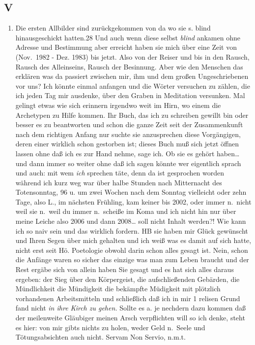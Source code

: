 \documentclass[
]{article}
\author{}
\date{\vspace{-2.5em}}
\providecommand{\tightlist}{%
  \setlength{\itemsep}{0pt}\setlength{\parskip}{0pt}}
\begin{document}
\subsection{V}\label{v}

\begin{enumerate}
\def\labelenumi{\alph{enumi}.}
\setcounter{enumi}{3}
\tightlist
\item
  Die ersten Allbilder sind zurückgekommen von da wo sie s. blind
  hinausgeschickt hatten.28 Und auch wenn diese selbst \emph{blind}
  ankamen ohne Adresse und Bestimmung aber erreicht haben sie mich über
  eine Zeit von (Nov.~1982 - Dez. 1983) bis jetzt. Also von der Reiser
  und bis in den Rausch, Rausch des Alleinseins, Rausch der Besinnung.
  Aber wie den Menschen das erklären was da passiert zwischen mir, ihm
  und dem großen Ungeschriebenen vor uns? Ich könnte einmal anfangen und
  die Wörter versuchen zu zählen, die ich jeden Tag mir ausdenke, über
  den Graben in Meditation versunken. Mal gelingt etwas wie sich
  erinnern irgendwo weit im Hirn, wo einem die Archetypen zu Hilfe
  kommen. Ihr Buch, das ich zu schreiben gewillt bin oder besser es zu
  beantworten und schon die ganze Zeit seit der Zusammenkunft nach dem
  richtigen Anfang nur suchte sie anzusprechen diese Vorgängigen, deren
  einer wirklich schon gestorben ist; dieses Buch muß sich jetzt öffnen
  lassen ohne daß ich es zur Hand nehme, sage ich. Ob sie es gehört
  haben\ldots{} und dann immer so weiter ohne daß ich sagen könnte wer
  eigentlich sprach und auch: mit wem \emph{ich} sprechen täte, denn da
  ist gesprochen worden während ich kurz weg war über halbe Stunden nach
  Mitternacht des Totensonntag, 96 u. um zwei Wochen nach dem Sonntag
  vielleicht oder zehn Tage, also L., im nächsten Frühling, kam keiner
  bis 2002, oder immer n.~nicht weil sie n.~weil du immer n.~scheiße im
  Koma und ich nicht hin nur über meine Leiche also 2006 und dann
  2008\ldots{} soll nicht Inhalt werden?! Wie kann ich so naiv sein und
  das wirklich fordern. HB sie haben mir Glück gewünscht und Ihren Segen
  über mich gehalten und ich weiß was es damit auf sich hatte, nicht
  erst seit Hö. Poetologie obwohl darin schon alles gesagt ist. Nein,
  schon die Anfänge waren so sicher das einzige was man zum Leben
  braucht und der Rest ergäbe sich von allein haben Sie gesagt und es
  hat sich alles daraus ergeben: der Sieg über den Körpergeist, die
  aufschließenden Gebärden, die Mündlichkeit die Mündigkeit die
  bekämpfte Müdigkeit mit plötzlich vorhandenen Arbeitsmitteln und
  schließlich daß ich in mir 1 relisen Grund fand nicht \emph{in ihre
  Kirch zu gehen.} Sollte es a. je nechdern dazu kommen daß der
  meilenweite Gläubiger meinen Arsch verpflichten will so ich denke,
  steht es hier: von mir gibts nichts zu holen, weder Geld n.~Seele und
  Tötungsabsichten auch nicht. Servam Non Servio, n.m.t.
\end{enumerate}
\end{document}
